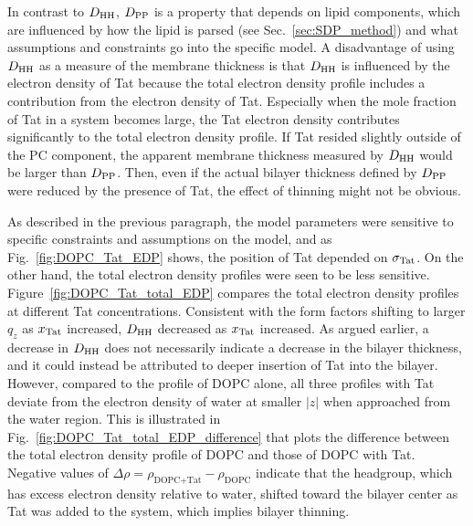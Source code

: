 In contrast to $D_\textrm{HH}$, $D_\textrm{PP}$ is a property that
depends on lipid components, which are influenced by how the lipid is parsed 
(see Sec.~\ref{sec:SDP_method})
and what assumptions and constraints go into the specific model.
A disadvantage of using $D_\textrm{HH}$ as a measure of the membrane thickness is
that $D_\textrm{HH}$ is influenced by the electron density of Tat because 
the total electron density profile includes a contribution from the electron density of Tat. 
Especially when the mole fraction of Tat in a system becomes large, 
the Tat electron density contributes significantly to the total electron 
density profile. If Tat resided slightly 
outside of the PC component, the apparent membrane thickness measured by $D_\textrm{HH}$
would be larger than $D_\textrm{PP}$. Then, even if the actual bilayer thickness defined by $D_\textrm{PP}$ 
were reduced by the presence of Tat, the effect of thinning might not be obvious. 

As described in the previous paragraph, the model parameters were sensitive to 
specific constraints and assumptions on the model, and as Fig.~\ref{fig:DOPC_Tat_EDP}
shows, the position of Tat depended on $\sigma_\textrm{Tat}$. On the other hand,
the total electron density profiles were seen to be less sensitive. 
Figure~\ref{fig:DOPC_Tat_total_EDP} compares the total electron density profiles
at different Tat concentrations. Consistent with the form factors shifting 
to larger $q_z$ as $x_\textrm{Tat}$ increased, $D_\textrm{HH}$ decreased as $x_\textrm{Tat}$ increased.
As argued earlier, a decrease in $D_\textrm{HH}$ does not necessarily indicate a decrease
in the bilayer thickness, and it could instead be attributed to deeper insertion
of Tat into the bilayer. However, compared to the profile of DOPC alone,
all three profiles with Tat deviate from the electron density of water 
at smaller $|z|$ when approached from the water region. This is illustrated 
in Fig.~\ref{fig:DOPC_Tat_total_EDP_difference} that plots the difference 
between the total electron density profile of DOPC and those of DOPC with Tat.
Negative values of $\Delta\rho = \rho_\text{DOPC+Tat} - \rho_\text{DOPC}$
indicate that the headgroup, which has excess electron density relative to
water, shifted toward the bilayer center as Tat was added to the system,
which implies bilayer thinning. 

